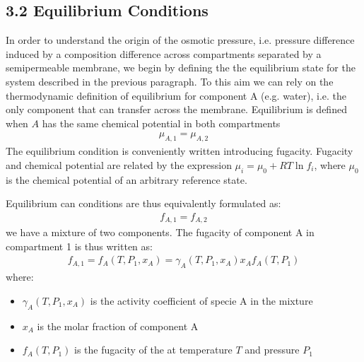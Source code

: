 \documentclass[letterpaper,10pt,english]{jupyterBook}
\begin{document}
\subsection{3.2 Equilibrium Conditions}
\label{\detokenize{Osmosis:equilibrium-conditions}}
\sphinxAtStartPar
In order to understand the origin of the osmotic pressure, i.e. pressure difference induced by a composition difference across compartments separated by a semipermeable membrane, we begin by defining the the equilibrium state for the system described in the previous paragraph.
To this aim we can rely on the thermodynamic definition of equilibrium for component A (e.g. water), i.e. the only component that can transfer across the membrane.
Equilibrium is defined when \(A\) has the same chemical potential in both compartments
\begin{equation}\label{equation:Osmosis:OSMeq0}
\begin{split}
\mu_{A,1}=\mu_{A,2}
\end{split}
\end{equation}
\sphinxAtStartPar
The equilibrium condition is conveniently written introducing fugacity.
Fugacity and chemical potential are related by the expression \(\mu_i=\mu_0+RT\ln{f_i}\), where \(\mu_0\) is the chemical potential of an arbitrary reference state.

\sphinxAtStartPar
Equilibrium can conditions are thus equivalently formulated as:
\begin{equation}\label{equation:Osmosis:OSMeq:Equilibrium}
\begin{split}
f_{A,1}=f_{A,2}
\end{split}
\end{equation}
\sphinxAtStartPar
{} we have a  mixture of two components. The fugacity of component A in compartment 1 is thus written as:
\begin{equation}\label{equation:Osmosis:OSMeq:leftside}
\begin{split}
f_{A,1}=f_A(T,P_1,x_A)=\gamma_A(T,P_1,x_A)x_A f_A(T,P_1)
\end{split}
\end{equation}
\sphinxAtStartPar
where:
\begin{itemize}
\item {} 
\sphinxAtStartPar
\(\gamma_A(T,P_1,x_A)\) is the activity coefficient of specie A in the mixture

\item {} 
\sphinxAtStartPar
\(x_A\) is the molar fraction of component A

\item {} 
\sphinxAtStartPar
\(f_A(T,P_1)\) is the fugacity of the  at temperature \(T\) and pressure \(P_1\)

\end{itemize}
\end{document}
